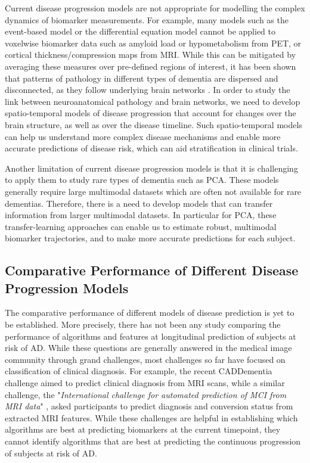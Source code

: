 Current disease progression models are not appropriate for modelling the complex dynamics of biomarker measurements. For example, many models such as the event-based model or the differential equation model cannot be applied to voxelwise biomarker data such as amyloid load or hypometabolism from PET, or cortical thickness/compression maps from MRI. While this can be mitigated by averaging these measures over pre-defined regions of interest, it has been shown that patterns of pathology in different types of dementia are dispersed and disconnected, as they follow underlying brain networks \cite{seeley2009neurodegenerative}. In order to study the link between neuroanatomical pathology and brain networks, we need to develop spatio-temporal models of disease progression that account for changes over the brain structure, as well as over the disease timeline. Such spatio-temporal models can help us understand more complex disease mechanisms and enable more accurate predictions of disease risk, which can aid stratification in clinical trials. 

Another limitation of current disease progression models is that it is challenging to apply them to study rare types of dementia such as PCA. These models generally require large multimodal datasets which are often not available for rare dementias. Therefore, there is a need to develop models that can transfer information from larger multimodal datasets. In particular for PCA, these transfer-learning approaches can enable us to estimate robust, multimodal biomarker trajectories, and to make more accurate predictions for each subject.

\subsection{Comparative Performance of Different Disease Progression Models}

The comparative performance of different models of disease prediction is yet to be established. More precisely, there has not been any study comparing the performance of algorithms and features at longitudinal prediction of subjects at risk of AD. While these questions are generally answered in the medical image community through grand challenges, most challenges so far have focused on classification of clinical diagnosis. For example, the recent CADDementia challenge \cite{bron2015standardized} aimed to predict clinical diagnosis from MRI scans, while a similar challenge, the "\emph{International challenge for automated prediction of MCI from MRI data}" \cite{sarica2018machine}, asked participants to predict diagnosis and conversion status from extracted MRI features. While these challenges are helpful in establishing which algorithms are best at predicting biomarkers at the current timepoint, they cannot identify algorithms that are best at predicting the continuous progression of subjects at risk of AD.

